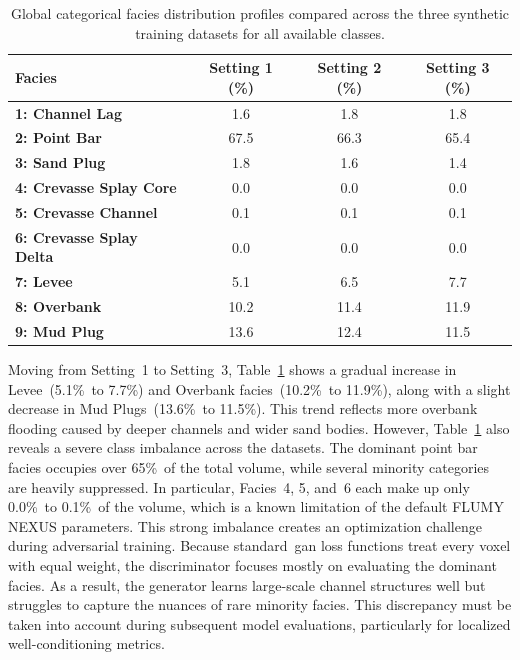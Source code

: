 \begin{table}[htbp!]
    \centering
    \renewcommand{\arraystretch}{1.4}
    \small
    \begin{tabularx}{\textwidth}{Xccc}
        \hline
        \textbf{Facies} & \textbf{Setting 1 (\%)} & \textbf{Setting 2 (\%)} & \textbf{Setting 3 (\%)}\\
        \hline
        \textbf{1: Channel Lag} & 1.6 & 1.8 & 1.8 \\
        \textbf{2: Point Bar} & 67.5 & 66.3 & 65.4 \\
        \textbf{3: Sand Plug} & 1.8 & 1.6 & 1.4 \\
        \textbf{4: Crevasse Splay Core} & 0.0 & 0.0 & 0.0 \\
        \textbf{5: Crevasse Channel} & 0.1  & 0.1 & 0.1 \\
        \textbf{6: Crevasse Splay Delta} & 0.0 & 0.0 & 0.0 \\
        \textbf{7: Levee} & 5.1 & 6.5 & 7.7 \\
        \textbf{8: Overbank} & 10.2 & 11.4 & 11.9 \\
        \textbf{9: Mud Plug} & 13.6 & 12.4 & 11.5 \\
        \hline
    \end{tabularx}
    \caption{Global categorical facies distribution profiles compared across the three synthetic training datasets for all available classes.}
    \label{tab:comparison_facies_distribution_flumy_samples}
\end{table}

Moving from Setting~1 to Setting~3, Table~\ref{tab:comparison_facies_distribution_flumy_samples} shows a gradual increase in Levee~(5.1\%~to 7.7\%) and Overbank facies~(10.2\%~to 11.9\%), along with a slight decrease in Mud Plugs~(13.6\%~to 11.5\%). This trend reflects more overbank flooding caused by deeper channels and wider sand bodies. However, Table~\ref{tab:comparison_facies_distribution_flumy_samples} also reveals a severe class imbalance across the datasets. The dominant point bar facies occupies over 65\%~of the total volume, while several minority categories are heavily suppressed. In particular, Facies~4, 5, and~6 each make up only 0.0\%~to 0.1\%~of the volume, which is a known limitation of the default FLUMY NEXUS parameters. This strong imbalance creates an optimization challenge during adversarial training. Because standard~\gls{gan} loss functions treat every voxel with equal weight, the discriminator focuses mostly on evaluating the dominant facies. As a result, the generator learns large-scale channel structures well but struggles to capture the nuances of rare minority facies. This discrepancy must be taken into account during subsequent model evaluations, particularly for localized well-conditioning metrics.

